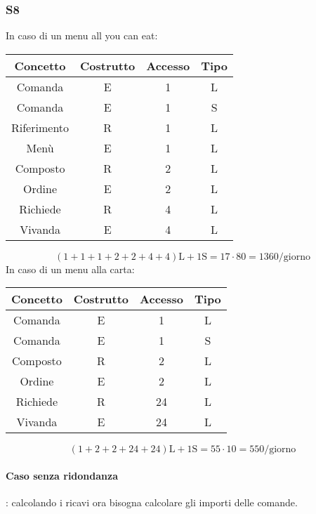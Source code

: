 \documentclass[a4paper,12pt]{report}
\begin{document}
\subsubsection{S8}
% 
In caso di un menu all you can eat:
\begin{table}[H]
    \centering
    \begin{tabular}{|| c | c | c | c ||}
        \hline
        Concetto & Costrutto & Accesso & Tipo\\
        \hline
        Comanda & E & 1 & L\\
        \hline
        Comanda & E & 1 & S\\
        \hline
        Riferimento & R & 1 & L\\
        \hline
        Menù & E & 1 & L\\
        \hline
        Composto & R & 2 & L\\
        \hline
        Ordine & E & 2 & L\\
        \hline
        Richiede & R & 4 & L\\
        \hline
        Vivanda & E & 4 & L\\
        \hline
    \end{tabular}
\end{table}
\begin{equation}
    (1+1+1+2+2+4+4)\text{L} + 1\text{S} = 17 \cdot 80 = 1360\text{/giorno}
\end{equation}
%
In caso di un menu alla carta:
\begin{table}[H]
    \centering
    \begin{tabular}{|| c | c | c | c ||}
        \hline
        Concetto & Costrutto & Accesso & Tipo\\
        \hline
        Comanda & E & 1 & L\\
        \hline
        Comanda & E & 1 & S\\
        \hline
        Composto & R & 2 & L\\
        \hline
        Ordine & E & 2 & L\\
        \hline
        Richiede & R & 24 & L\\
        \hline
        Vivanda & E & 24 & L\\
        \hline
    \end{tabular}
\end{table}
\begin{equation}
    (1+2+2+24+24)\text{L} + 1\text{S}= 55 \cdot 10 = 550\text{/giorno}
\end{equation}
%
\paragraph{Caso senza ridondanza}: calcolando i ricavi ora bisogna calcolare gli importi delle comande.
\end{document}
